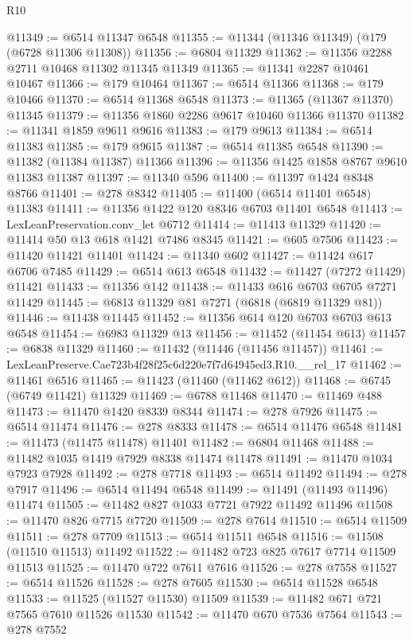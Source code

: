 \begin{lexlean}{R10}
\begin{coremodule}
@11349 := @6514 @11347 @6548
@11355 := @11344 (@11346 @11349) (@179 (@6728 @11306 @11308))
@11356 := @6804 @11329
@11362 := @11356 @2288 @2711 @10468 @11302 @11345 @11349
@11365 := @11341 @2287 @10461 @10467
@11366 := @179 @10464
@11367 := @6514 @11366
@11368 := @179 @10466
@11370 := @6514 @11368 @6548
@11373 := @11365 (@11367 @11370) @11345
@11379 := @11356 @1860 @2286 @9617 @10460 @11366 @11370
@11382 := @11341 @1859 @9611 @9616
@11383 := @179 @9613
@11384 := @6514 @11383
@11385 := @179 @9615
@11387 := @6514 @11385 @6548
@11390 := @11382 (@11384 @11387) @11366
@11396 := @11356 @1425 @1858 @8767 @9610 @11383 @11387
@11397 := @11340 @596
@11400 := @11397 @1424 @8348 @8766
@11401 := @278 @8342
@11405 := @11400 (@6514 @11401 @6548) @11383
@11411 := @11356 @1422 @120 @8346 @6703 @11401 @6548
@11413 := LexLeanPreservation.conv_let @6712
@11414 := @11413 @11329
@11420 := @11414 @50 @13 @618 @1421 @7486 @8345
@11421 := @605 @7506
@11423 := @11420 @11421 @11401
@11424 := @11340 @602
@11427 := @11424 @617 @6706 @7485
@11429 := @6514 @613 @6548
@11432 := @11427 (@7272 @11429) @11421
@11433 := @11356 @142
@11438 := @11433 @616 @6703 @6705 @7271 @11429
@11445 := @6813 @11329 @81 @7271 (@6818 (@6819 @11329 @81))
@11446 := @11438 @11445
@11452 := @11356 @614 @120 @6703 @6703 @613 @6548
@11454 := @6983 @11329 @13
@11456 := @11452 (@11454 @613)
@11457 := @6838 @11329
@11460 := @11432 (@11446 (@11456 @11457))
@11461 := LexLeanPreserve.Cae723b4f28f25c6d220e7f7d64945ed3.R10.__rel_17
@11462 := @11461 @6516
@11465 := @11423 (@11460 (@11462 @612))
@11468 := @6745 (@6749 @11421) @11329
@11469 := @6788 @11468
@11470 := @11469 @488
@11473 := @11470 @1420 @8339 @8344
@11474 := @278 @7926
@11475 := @6514 @11474
@11476 := @278 @8333
@11478 := @6514 @11476 @6548
@11481 := @11473 (@11475 @11478) @11401
@11482 := @6804 @11468
@11488 := @11482 @1035 @1419 @7929 @8338 @11474 @11478
@11491 := @11470 @1034 @7923 @7928
@11492 := @278 @7718
@11493 := @6514 @11492
@11494 := @278 @7917
@11496 := @6514 @11494 @6548
@11499 := @11491 (@11493 @11496) @11474
@11505 := @11482 @827 @1033 @7721 @7922 @11492 @11496
@11508 := @11470 @826 @7715 @7720
@11509 := @278 @7614
@11510 := @6514 @11509
@11511 := @278 @7709
@11513 := @6514 @11511 @6548
@11516 := @11508 (@11510 @11513) @11492
@11522 := @11482 @723 @825 @7617 @7714 @11509 @11513
@11525 := @11470 @722 @7611 @7616
@11526 := @278 @7558
@11527 := @6514 @11526
@11528 := @278 @7605
@11530 := @6514 @11528 @6548
@11533 := @11525 (@11527 @11530) @11509
@11539 := @11482 @671 @721 @7565 @7610 @11526 @11530
@11542 := @11470 @670 @7536 @7564
@11543 := @278 @7552

\end{coremodule}
\end{lexlean}
